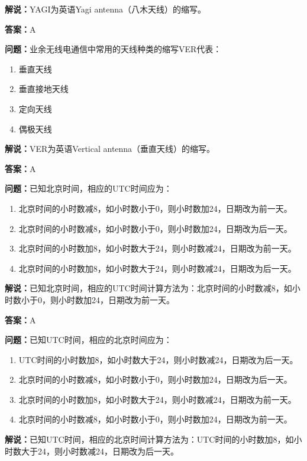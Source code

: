 \textbf{解说：}YAGI为英语Yagi antenna（八木天线）的缩写。

\textbf{答案：}A

\textbf{问题：}业余无线电通信中常用的天线种类的缩写VER代表：

\begin{enumerate}[label=\Alph*), leftmargin=1cm]
	\item 垂直天线
	\item 垂直接地天线
	\item 定向天线
	\item 偶极天线
\end{enumerate}

\textbf{解说：}VER为英语Vertical antenna（垂直天线）的缩写。

\textbf{答案：}A

\textbf{问题：}已知北京时间，相应的UTC时间应为：

\begin{enumerate}[label=\Alph*), leftmargin=1cm]
	\item 北京时间的小时数减8，如小时数小于0，则小时数加24，日期改为前一天。
	\item 北京时间的小时数减8，如小时数小于0，则小时数加24，日期改为后一天。
	\item 北京时间的小时数加8，如小时数大于24，则小时数减24，日期改为前一天。
	\item 北京时间的小时数加8，如小时数大于24，则小时数减24，日期改为后一天。
\end{enumerate}

\textbf{解说：}已知北京时间，相应的UTC时间计算方法为：北京时间的小时数减8，如小时数小于0，则小时数加24，日期改为前一天。

\textbf{答案：}A

\textbf{问题：}已知UTC时间，相应的北京时间应为：

\begin{enumerate}[label=\Alph*), leftmargin=1cm]
	\item UTC时间的小时数加8，如小时数大于24，则小时数减24，日期改为后一天。
	\item 北京时间的小时数减8，如小时数小于0，则小时数加24，日期改为后一天。
	\item 北京时间的小时数加8，如小时数大于24，则小时数减24，日期改为前一天。
	\item 北京时间的小时数减8，如小时数小于0，则小时数加24，日期改为前一天。
\end{enumerate}

\textbf{解说：}已知UTC时间，相应的北京时间计算方法为：UTC时间的小时数加8，如小时数大于24，则小时数减24，日期改为后一天。

